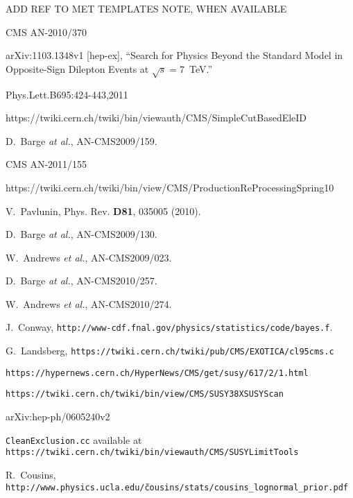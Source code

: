 \begin{thebibliography}{10}

 ADD REF TO MET TEMPLATES NOTE, WHEN AVAILABLE

 CMS AN-2010/370

 arXiv:1103.1348v1 [hep-ex], ``Search for Physics Beyond the Standard Model in Opposite-Sign Dilepton Events at $\sqrt{s} = 7$~TeV.''

 Phys.Lett.B695:424-443,2011 

 https://twiki.cern.ch/twiki/bin/viewauth/CMS/SimpleCutBasedEleID

 D.~Barge {\em at al.}, AN-CMS2009/159.

 CMS AN-2011/155

 https://twiki.cern.ch/twiki/bin/view/CMS/ProductionReProcessingSpring10 

V.~Pavlunin, Phys. Rev. {\bf D81}, 035005 (2010).

  D.~Barge {\em at al.}, AN-CMS2009/130.

 W.~Andrews {\em et al.}, AN-CMS2009/023.

 D.~Barge {\em at al.}, AN-CMS2010/257.

W.~Andrews {\em et al.}, AN-CMS2010/274.

 J.~Conway, {\tt http://www-cdf.fnal.gov/physics/statistics/code/bayes.f}.

 G.~Landsberg, {\tt https://twiki.cern.ch/twiki/pub/CMS/EXOTICA/cl95cms.c}

 {\tt https://hypernews.cern.ch/HyperNews/CMS/get/susy/617/2/1.html}

 {\tt https://twiki.cern.ch/twiki/bin/view/CMS/SUSY38XSUSYScan}

 arXiv:hep-ph/0605240v2

 {\tt CleanExclusion.cc} available at
{\tt https://twiki.cern.ch/twiki/bin/viewauth/CMS/SUSYLimitTools}

 R.~Cousins, {\tt http://www.physics.ucla.edu/\~cousins/stats/cousins\_lognormal\_prior.pdf}


\end{thebibliography}
